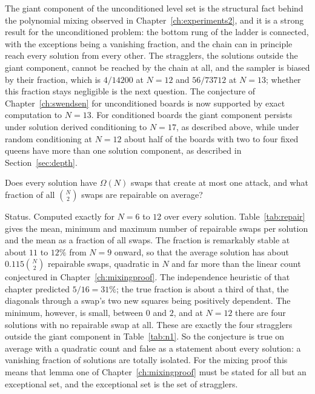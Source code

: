 The giant component of the unconditioned level set is the structural fact behind the polynomial mixing observed in Chapter~\ref{ch:experiments2}, and it is a strong result for the unconditioned problem: the bottom rung of the ladder is connected, with the exceptions being a vanishing fraction, and the chain can in principle reach every solution from every other. The stragglers, the solutions outside the giant component, cannot be reached by the chain at all, and the sampler is biased by their fraction, which is $4 / 14200$ at $N = 12$ and $56 / 73712$ at $N = 13$; whether this fraction stays negligible is the next question. The conjecture of Chapter~\ref{ch:swendsen} for unconditioned boards is now supported by exact computation to $N = 13$. For conditioned boards the giant component persists under solution derived conditioning to $N = 17$, as described above, while under random conditioning at $N = 12$ about half of the boards with two to four fixed queens have more than one solution component, as described in Section~\ref{sec:depth}.

\begin{problem}
Does every solution have $\Omega(N)$ swaps that create at most one attack, and what fraction of all $\binom{N}{2}$ swaps are repairable on average?
\end{problem}

Status. Computed exactly for $N = 6$ to $12$ over every solution. Table~\ref{tab:repair} gives the mean, minimum and maximum number of repairable swaps per solution and the mean as a fraction of all swaps. The fraction is remarkably stable at about $11$ to $12\%$ from $N = 9$ onward, so that the average solution has about $0.115 \binom{N}{2}$ repairable swaps, quadratic in $N$ and far more than the linear count conjectured in Chapter~\ref{ch:mixingproof}. The independence heuristic of that chapter predicted $5/16 = 31\%$; the true fraction is about a third of that, the diagonals through a swap's two new squares being positively dependent. The minimum, however, is small, between $0$ and $2$, and at $N = 12$ there are four solutions with no repairable swap at all. These are exactly the four stragglers outside the giant component in Table~\ref{tab:n1}. So the conjecture is true on average with a quadratic count and false as a statement about every solution: a vanishing fraction of solutions are totally isolated. For the mixing proof this means that lemma one of Chapter~\ref{ch:mixingproof} must be stated for all but an exceptional set, and the exceptional set is the set of stragglers.


